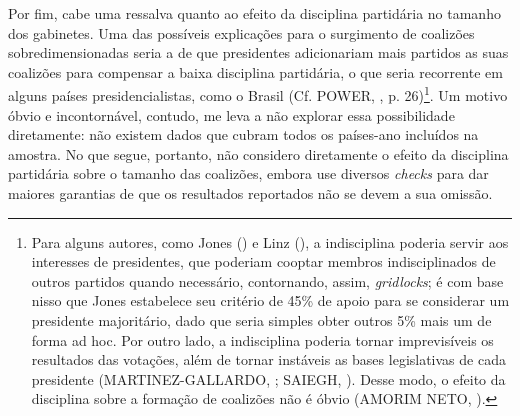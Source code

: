 Por fim, cabe uma ressalva quanto ao efeito da disciplina partidária no tamanho dos gabinetes. Uma das possíveis explicações para o surgimento de coalizões sobredimensionadas seria a de que presidentes adicionariam mais partidos as suas coalizões para compensar a baixa disciplina partidária, o que seria recorrente em alguns países presidencialistas, como o Brasil (Cf. POWER, \citeyear{power2010}, p. 26)\footnote{Para alguns autores, como Jones (\citeyear{jones1995}) e Linz (\citeyear{linz1990}), a indisciplina poderia servir aos interesses de presidentes, que poderiam cooptar membros indisciplinados de outros partidos quando necessário, contornando, assim, \textit{gridlocks}; é com base nisso que Jones estabelece seu critério de 45\% de apoio para se considerar um presidente majoritário, dado que seria simples obter outros 5\% mais um de forma ad hoc.  Por outro lado, a indisciplina poderia tornar imprevisíveis os resultados das votações, além de tornar instáveis as bases legislativas de cada presidente (MARTINEZ-GALLARDO, \citeyear{martinez2012}; SAIEGH, \citeyear{saiegh2009}). Desse modo, o efeito da disciplina sobre a formação de coalizões não é óbvio (AMORIM NETO, \citeyear{neto2006}).}. Um motivo óbvio e incontornável, contudo, me leva a não explorar essa possibilidade diretamente: não existem dados que cubram todos os países-ano incluídos na amostra. No que segue, portanto, não considero diretamente o efeito da disciplina partidária sobre o tamanho das coalizões, embora use diversos \textit{checks} para dar maiores garantias de que os resultados reportados não se devem a sua omissão.
